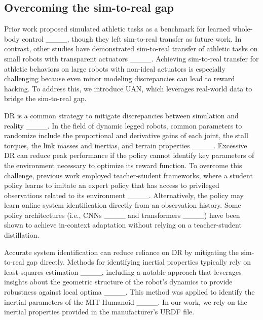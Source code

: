 \subsection{Overcoming the sim-to-real gap}
Prior work proposed simulated athletic tasks as a benchmark for learned whole-body control ____, though they left sim-to-real transfer as future work. In contrast, other studies have demonstrated sim-to-real transfer of athletic tasks on small robots with transparent actuators ____. Achieving sim-to-real transfer for athletic behaviors on large robots with non-ideal actuators is especially challenging because even minor modeling discrepancies can lead to reward hacking. To address this, we introduce UAN, which leverages real-world data to bridge the sim-to-real gap.

DR is a common strategy to mitigate discrepancies between simulation and reality ____. In the field of dynamic legged robots, common parameters to randomize include the proportional and derivative gains of each joint, the stall torques, the link masses and inertias, and terrain properties ____. Excessive DR can reduce peak performance if the policy cannot identify key parameters of the environment necessary to optimize its reward function. To overcome this challenge, previous work employed teacher-student frameworks, where a student policy learns to imitate an expert policy that has access to privileged observations related to its environment ____. Alternatively, the policy may learn online system identification directly from an observation history. Some policy architectures (i.e., CNNs ____ and transformers ____) have been shown to achieve in-context adaptation
without relying on a teacher-student distillation.

Accurate system identification can reduce reliance on DR by mitigating the sim-to-real gap directly.
Methods for identifying inertial properties typically rely on least-squares estimation ____, including a notable approach that leverages insights about the geometric structure of the robot's dynamics to provide robustness against local optima ____. This method was applied to identify the inertial parameters of the MIT Humanoid ____. In our work, we rely on the inertial properties provided in the manufacturer's URDF file.


